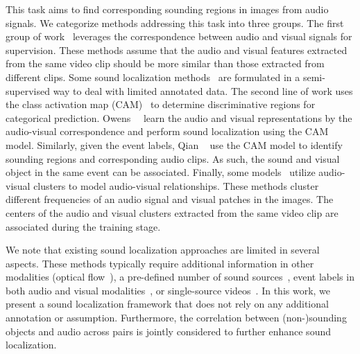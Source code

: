 

This task aims to find corresponding sounding regions in images from audio signals. 
%
We categorize methods addressing this task into three groups.
%
The first group of work~\cite{av_eccv20_objs_vids,av_cvpr18_lls,av_tpami20_lls} leverages the correspondence between audio and visual signals for supervision.
%
These methods assume that the audio and visual features extracted from the same video clip should be more similar than those extracted from different clips.
%
Some sound localization methods~\cite{av_cvpr18_lls,av_tpami20_lls} are formulated in a semi-supervised way to deal with limited annotated data.
%
The second line of work uses the class activation map (CAM)~\cite{cvpr16_CAM} to determine discriminative regions for categorical prediction.
%
Owens~\etal~\cite{av_eccv18_Owens} learn the audio and visual representations by the audio-visual correspondence and perform sound localization using the CAM model. 
%
Similarly, given the event labels, Qian \etal~\cite{av_eccv20_mms_loc} use the CAM model to identify sounding regions and corresponding audio clips.
%
As such, the sound and visual object in the same event can be associated.
%
Finally, some models~\cite{av_cvpr19_deep_cluster,av_arxiv_curricumlum_av_clutser} utilize audio-visual clusters to model audio-visual relationships.
%
These methods cluster different frequencies of an audio signal and visual patches in the images.
%
The centers of the audio and visual clusters extracted from the same video clip are associated during the training stage.

We note that existing sound localization approaches are limited in several aspects. 
%
These methods typically require additional information in other modalities (\eg optical flow~\cite{av_eccv20_objs_vids}), a pre-defined number of sound sources~\cite{av_cvpr19_deep_cluster,av_arxiv_curricumlum_av_clutser}, event labels in both audio and visual modalities~\cite{av_eccv20_mms_loc}, or single-source videos~\cite{av_nips20_loc}. 
%
In this work, we present a sound localization framework that does not rely on any additional annotation or assumption. 
%
Furthermore, the correlation between (non-)sounding objects and audio across pairs is jointly considered to further enhance sound localization.%
%
